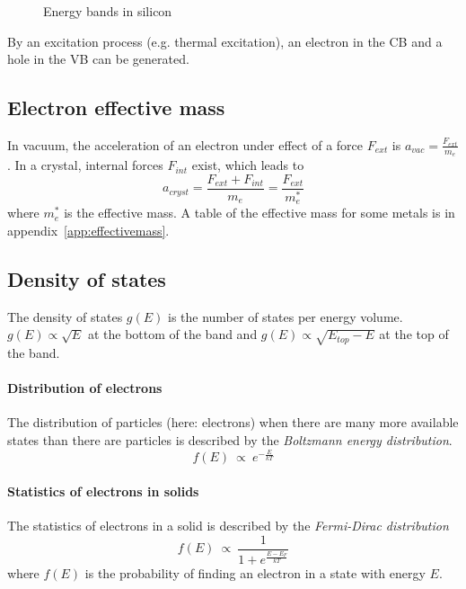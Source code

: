 \begin{figure}[ht!]
    \centering
    
    \caption{Energy bands in silicon}
\end{figure}

By an excitation process (e.g. thermal excitation), an electron in the CB and
a hole in the VB can be generated.

\subsection{Electron effective mass}
In vacuum, the acceleration of an electron under effect of a force $F_{ext}$ is $a_{vac} = \frac{F_{ext}}{m_e}$. 
In a crystal, internal forces $F_{int}$ exist, which leads to
\begin{equation}
    a_{cryst} = \frac{F_{ext}+F_{int}}{m_e} = \frac{F_{ext}}{m_e^*}
\end{equation}
where $m_e^*$ is the effective mass.
A table of the effective mass for some metals is in appendix~\ref{app:effectivemass}.

\subsection{Density of states}
The density of states $g(E)$ is the number of states per energy volume. 
$g(E) \propto \sqrt{E}$ at the bottom of the band and $g(E) \propto \sqrt{E_{top}-E}$ at the top of the band.

\paragraph{Distribution of electrons}
The distribution of particles (here: electrons) when there are many more available
 states than there are particles is described by the 
 \emph{Boltzmann energy distribution}.
\begin{equation}
    f(E) \:\propto\: e^{-\frac{E}{kT}}
\end{equation} 

\paragraph{Statistics of electrons in solids}
The statistics of electrons in a solid is described by the \emph{Fermi-Dirac distribution}
\begin{equation}
    f(E) \:\propto\: \frac{1}{1 + e^{\frac{E-E_F}{kT}}}
\end{equation}
where $f(E)$ is the probability of finding an electron in a state with energy $E$.

